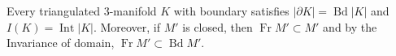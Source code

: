 Every triangulated 3-manifold $K$ with boundary satisfies $|\partial K| = \operatorname{Bd}|K|$ and $I(K) = \operatorname{Int}|K|$. Moreover, if $M'$ is closed, then $\operatorname{Fr} M' \subset M'$ and by the Invariance of domain, $\operatorname{Fr} M' \subset \operatorname{Bd} M'$.

